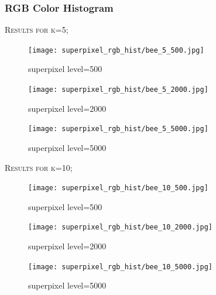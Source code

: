 \documentclass[12pt]{article}
\begin{document}
\subsubsection*{RGB Color Histogram}
\begin{minipage}{\linewidth}
\centering
	\textsc{\large Results for k=5;}\\[0.1 cm]  
	\begin{minipage}{0.45\linewidth}
		\begin{figure} [H]
			\centering
			 \texttt{[image: superpixel\_rgb\_hist/bee\_5\_500.jpg]}
	 		\caption{superpixel level=500}
		\end{figure}
	\end{minipage}
	\hspace{0.05\linewidth}
	\begin{minipage}{0.45\linewidth}
			\begin{figure} [H]
				\centering
				 \texttt{[image: superpixel\_rgb\_hist/bee\_5\_2000.jpg]}
	 			\caption{superpixel level=2000}
			\end{figure}
	\end{minipage}
	\hspace{0.05\linewidth}
	\begin{minipage}{0.45\linewidth}
		\begin{figure} [H]
			\centering
			 \texttt{[image: superpixel\_rgb\_hist/bee\_5\_5000.jpg]}
	 		\caption{superpixel level=5000}
		\end{figure}
	\end{minipage}
\end{minipage}

\begin{minipage}{\linewidth}
\centering
	\textsc{\large Results for k=10;}\\[0.1 cm]  
	\begin{minipage}{0.45\linewidth}
		\begin{figure} [H]
			\centering
			 \texttt{[image: superpixel\_rgb\_hist/bee\_10\_500.jpg]}
	 		\caption{superpixel level=500}
		\end{figure}
	\end{minipage}
	\hspace{0.05\linewidth}
	\begin{minipage}{0.45\linewidth}
			\begin{figure} [H]
				\centering
				 \texttt{[image: superpixel\_rgb\_hist/bee\_10\_2000.jpg]}
	 			\caption{superpixel level=2000}
			\end{figure}
	\end{minipage}
	\hspace{0.05\linewidth}
	\begin{minipage}{0.45\linewidth}
		\begin{figure} [H]
			\centering
			 \texttt{[image: superpixel\_rgb\_hist/bee\_10\_5000.jpg]}
	 		\caption{superpixel level=5000}
		\end{figure}
	\end{minipage}
\end{minipage}
\end{document}
